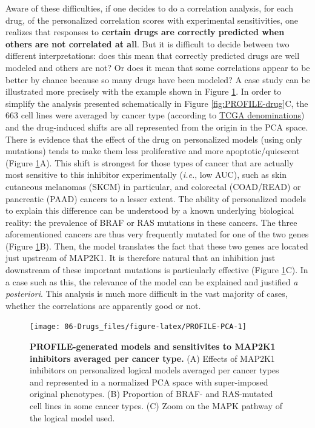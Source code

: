 \documentclass[a4paper,12pt,twoside,onecolumn,openright,final,oldfontcommands]{memoir}
\begin{document}
Aware of these difficulties, if one decides to do a correlation
analysis, for each drug, of the personalized correlation scores with
experimental sensitivities, one realizes that responses to
\textbf{certain drugs are correctly predicted when others are not
correlated at all}. But it is difficult to decide between two different
interpretations: does this mean that correctly predicted drugs are well
modeled and others are not? Or does it mean that some correlations
appear to be better by chance because so many drugs have been modeled? A
case study can be illustrated more precisely with the example shown in
Figure \ref{fig:PROFILE-PCA}. In order to simplify the analysis
presented schematically in Figure \ref{fig:PROFILE-drug}C, the 663 cell
lines were averaged by cancer type (according to
\href{https://gdc.cancer.gov/resources-tcga-users/tcga-code-tables/tcga-study-abbreviations}{TCGA
denominations}) and the drug-induced shifts are all represented from the
origin in the PCA space. There is evidence that the effect of the drug
on personalized models (using only mutations) tends to make them less
proliferative and more apoptotic/quiescent (Figure
\ref{fig:PROFILE-PCA}A). This shift is strongest for those types of
cancer that are actually most sensitive to this inhibitor experimentally
(\emph{i.e.}, low AUC), such as skin cutaneous melanomas (SKCM) in
particular, and colorectal (COAD/READ) or pancreatic (PAAD) cancers to a
lesser extent. The ability of personalized models to explain this
difference can be understood by a known underlying biological reality:
the prevalence of BRAF or RAS mutations in these cancers. The three
aforementioned cancers are thus very frequently mutated for one of the
two genes (Figure \ref{fig:PROFILE-PCA}B). Then, the model translates
the fact that these two genes are located just upstream of MAP2K1. It is
therefore natural that an inhibition just downstream of these important
mutations is particularly effective (Figure \ref{fig:PROFILE-PCA}C). In
a case such as this, the relevance of the model can be explained and
justified \emph{a posteriori}. This analysis is much more difficult in
the vast majority of cases, whether the correlations are apparently good
or not.

\begin{figure}

{\centering \texttt{[image: 06-Drugs\_files/figure-latex/PROFILE-PCA-1]} 

}

\caption[PROFILE-generated models and sensitivites to MAP2K1  inhibitors averaged per cancer type]{\textbf{PROFILE-generated models and
sensitivites to MAP2K1 inhibitors averaged per cancer type.} (A) Effects
of MAP2K1 inhibitors on personalized logical models averaged per cancer
types and represented in a normalized PCA space with super-imposed
original phenotypes. (B) Proportion of BRAF- and RAS-mutated cell lines
in some cancer types. (C) Zoom on the MAPK pathway of the logical model
used.}\label{fig:PROFILE-PCA}
\end{figure}
\end{document}
